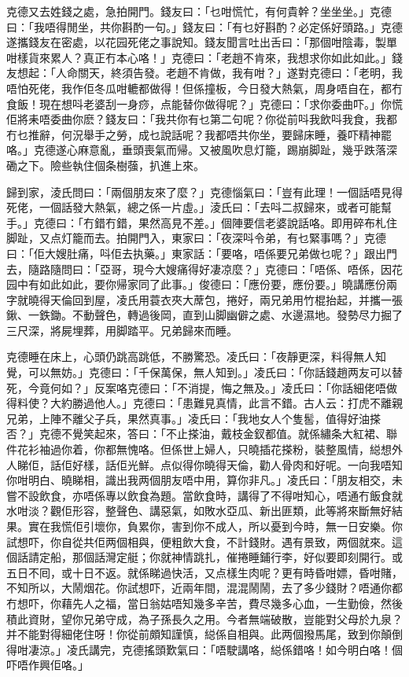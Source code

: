 \documentclass[a5paper, 12pt, openany]{book} %
\begin{document}
	克德又去姓錢之處，急拍開門。錢友曰：「乜咁慌忙，有何貴幹？坐坐坐。」克德曰：「我唔得閒坐，共你斟酌一句。」錢友曰：「有乜好斟酌？必定係好頭路。」克德遂攜錢友在密處，以花园死佬之事說知。錢友聞言吐出舌曰：「那個咁陰毒，製單咁樣貨來累人？真正冇本心咯！」克德曰：「老趙不肯來，我想求你如此如此。」錢友想起：「人命關天，終須告發。老趙不肯做，我有咁？」遂對克德曰：「老明，我唔怕死佬，我作佢冬瓜咁轆都做得！但係撞板，今日發大熱氣，周身唔自在，都冇食飯！現在想呌老婆刮一身痧，点能替你做得呢？」克德曰：「求你委曲吓。」你慌佢將耒唔委曲你麽？錢友曰：「我共你有乜第二句呢？你從前呌我飲呌我食，我都冇乜推辭，何況舉手之勞，成乜說話呢？我都唔共你坐，要歸床睡，養吓精神罷咯。」克德遂心麻意亂，垂頭喪氣而帰。又被風吹息灯籠，踢崩脚趾，幾乎跌落深磡之下。險些執住個条樹蔃，扒進上來。

	歸到家，淩氏問曰：「兩個朋友來了麼？」克德惱氣曰：「豈有此理！一個話唔見得死佬，一個話發大熱氣，總之係一片虛。」淩氏曰：「去呌二叔歸來，或者可能幫手。」克德曰：「冇錯冇錯，果然高見不差。」個陣要信老婆說話咯。即用碎布札住脚趾，又点灯籠而去。拍開門入，東家曰：「夜深呌令弟，有乜緊事嗎？」克德曰：「佢大嫂肚痛，呌佢去执藥。」東家話：「要咯，唔係要兄弟做乜呢？」跟出門去，隨路隨問曰：「亞哥，現今大嫂痛得好凄凉麼？」克德曰：「唔係、唔係，因花园中有如此如此，要你帰家同了此事。」俊德曰：「應份要，應份要。」曉講應份兩字就曉得天倫回到屋，凌氏用蓑衣夾大蓆包，捲好，兩兄弟用竹棍抬起，并攜一張鍬、一鉄鋤。不動聲色，轉過後岡，直到山脚幽僻之處、水邊濕地。發勢尽力掘了三尺深，將屍埋葬，用脚踏平。兄弟歸來而睡。

	克德睡在床上，心頭仍跳高跳低，不勝驚恐。凌氏曰：「夜靜更深，料得無人知覺，可以無妨。」克德曰：「千保萬保，無人知到。」凌氏曰：「你話錢趙两友可以替死，今竟何如？」反案咯克德曰：「不消提，悔之無及。」凌氏曰：「你話細佬唔做得料使？大約勝過他人。」克德曰：「患難見真情，此言不錯。古人云：打虎不離親兄弟，上陣不離父子兵，果然真事。」凌氏曰：「我地女人个隻䯻，值得好油搽否？」克德不覺笑起來，答曰：「不止搽油，戴枝金釵都值。就係繡条大紅裙、聯件花衫袖過你着，你都無愧咯。但係世上婦人，只曉插花搽粉，裝整風情，縂想外人睇佢，話佢好樣，話佢光鮮。点似得你曉得天倫，勸人骨肉和好呢。一向我唔知你咁明白、曉睇相，識出我两個朋友唔中用，算你非凡。」凌氏曰：「朋友相交，未嘗不設飲食，亦唔係專以飲食為題。當飲食時，講得了不得咁知心，唔通冇飯食就水咁淡？觀佢形容，整聲色、講惡氣，如敗水亞瓜、新出匪類，此等將來斷無好結果。實在我慌佢引壞你，負累你，害到你不成人，所以憂到今時，無一日安樂。你試想吓，你自從共佢两個相與，便粗飲大食，不計錢財。遇有景致，两個就來。這個話請定船，那個話灣定艇；你就神情跳扎，催捲睡鋪行李，好似要即刻開行。或五日不囘，或十日不返。就係睇過快活，又点樣生肉呢？更有時昏咁嫖，昏咁賭，不知所以，大鬧烟花。你試想吓，近兩年間，混混鬧鬧，去了多少錢財？唔通你都冇想吓，你藉先人之福，當日翁姑唔知幾多辛苦，費尽幾多心血，一生勤儉，然後積此資財，望你兄弟守成，為子孫長久之用。今者無端破散，豈能對父母於九泉？并不能對得細佬住呀！你從前頗知謹慎，縂係自相與。此两個撥馬尾，致到你顛倒得咁凄涼。」凌氏講完，克德搖頭歎氣曰：「唔駛講咯，縂係錯咯！如今明白咯！個吓唔作興佢咯。」
\end{document}
